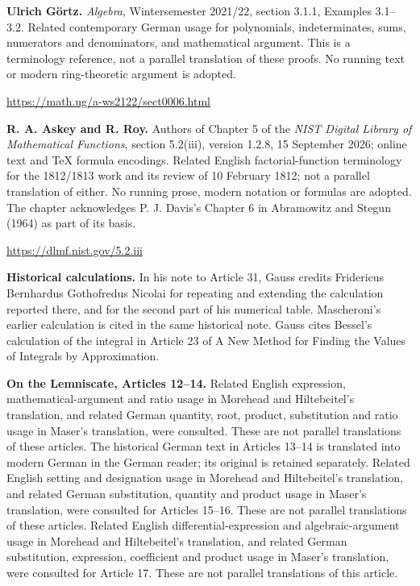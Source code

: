 \par\medskip\textbf{Ulrich Görtz.} \emph{Algebra}, Wintersemester 2021/22, section 3.1.1, Examples 3.1–3.2. Related contemporary German usage for polynomials, indeterminates, sums, numerators and denominators, and mathematical argument. This is a terminology reference, not a parallel translation of these proofs. No running text or modern ring-theoretic argument is adopted.\par
\url{https://math.ug/a-ws2122/sect0006.html}
\par\medskip\textbf{R. A. Askey and R. Roy.} Authors of Chapter 5 of the \emph{NIST Digital Library of Mathematical Functions}, section 5.2(iii), version 1.2.8, 15 September 2026; online text and TeX formula encodings. Related English factorial-function terminology for the 1812/1813 work and its review of 10 February 1812; not a parallel translation of either. No running prose, modern notation or formulas are adopted. The chapter acknowledges P. J. Davis’s Chapter 6 in Abramowitz and Stegun (1964) as part of its basis.\par
\url{https://dlmf.nist.gov/5.2.iii}
\par\medskip\textbf{Historical calculations.} In his note to Article 31, Gauss credits Fridericus Bernhardus Gothofredus Nicolai for repeating and extending the calculation reported there, and for the second part of his numerical table. Mascheroni\textquoteright s earlier calculation is cited in the same historical note. Gauss cites Bessel’s calculation of the integral in Article 23 of A New Method for Finding the Values of Integrals by Approximation.
\par\medskip\textbf{On the Lemniscate, Articles 12–14.} Related English expression, mathematical-argument and ratio usage in Morehead and Hiltebeitel’s translation, and related German quantity, root, product, substitution and ratio usage in Maser’s translation, were consulted. These are not parallel translations of these articles. The historical German text in Articles 13–14 is translated into modern German in the German reader; its original is retained separately. Related English setting and designation usage in Morehead and Hiltebeitel’s translation, and related German substitution, quantity and product usage in Maser’s translation, were consulted for Articles 15–16. These are not parallel translations of these articles. Related English differential-expression and algebraic-argument usage in Morehead and Hiltebeitel’s translation, and related German substitution, expression, coefficient and product usage in Maser’s translation, were consulted for Article 17. These are not parallel translations of this article.
